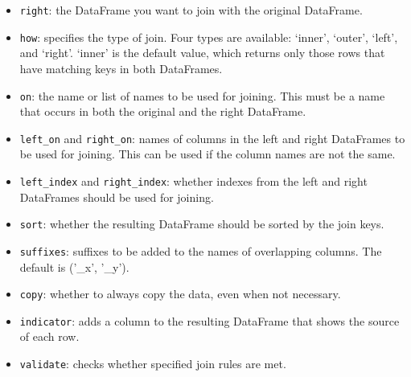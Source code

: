\documentclass[
  english,
  letterpaper,
  DIV=11,
  numbers=noendperiod]{scrreprt}
\providecommand{\tightlist}{%
  \setlength{\itemsep}{0pt}\setlength{\parskip}{0pt}}
\begin{document}
\begin{itemize}
\tightlist
\item
  \texttt{right}: the DataFrame you want to join with the original
  DataFrame.
\item
  \texttt{how}: specifies the type of join. Four types are available:
  `inner', `outer', `left', and `right'. `inner' is the default value,
  which returns only those rows that have matching keys in both
  DataFrames.
\item
  \texttt{on}: the name or list of names to be used for joining. This
  must be a name that occurs in both the original and the right
  DataFrame.
\item
  \texttt{left\_on} and \texttt{right\_on}: names of columns in the left
  and right DataFrames to be used for joining. This can be used if the
  column names are not the same.
\item
  \texttt{left\_index} and \texttt{right\_index}: whether indexes from
  the left and right DataFrames should be used for joining.
\item
  \texttt{sort}: whether the resulting DataFrame should be sorted by the
  join keys.
\item
  \texttt{suffixes}: suffixes to be added to the names of overlapping
  columns. The default is ('\_x', '\_y').
\item
  \texttt{copy}: whether to always copy the data, even when not
  necessary.
\item
  \texttt{indicator}: adds a column to the resulting DataFrame that
  shows the source of each row.
\item
  \texttt{validate}: checks whether specified join rules are met.
\end{itemize}
\end{document}
